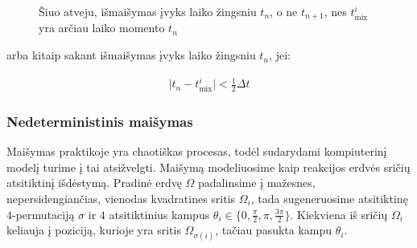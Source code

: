\newpage

\begin{figure}[!h]
\centering
\label{mix-inequality-graphic}
\caption{Šiuo atveju, išmaišymas įvyks laiko žingsniu $t_n$, o ne $t_{n+1}$, nes $t^i_\text{mix}$ yra arčiau laiko momento $t_n$}
\end{figure}

arba kitaip sakant išmaišymas įvyks laiko žingsniu $t_n$, jei:

\begin{align}
    \vert t_n - t^i_\text{mix} \vert < \frac{1}{2}\Delta t \label{mix-inequality}
\end{align}

\subsubsection*{Nedeterministinis maišymas}

Maišymas praktikoje yra chaotiškas procesas, todėl sudarydami kompiuterinį modelį turime į tai atsižvelgti. Maišymą modeliuosime kaip reakcijos erdvės sričių atsitiktinį išdėstymą. Pradinė erdvę $\Omega$ padalinsime į mažesnes, nepersidengiančias, vienodas kvadratines sritis $\Omega_i$, tada sugeneruosime atsitiktinę $4$-permutaciją $\sigma$ ir $4$ atsitiktinius kampus $\theta_i \in \{0, \frac{\pi}{2}, \pi, \frac{3\pi}{2}\}$. Kiekviena iš sričių $\Omega_i$ keliauja į poziciją, kurioje yra sritis $\Omega_{\sigma(i)}$, tačiau pasukta kampu $\theta_i$. 

